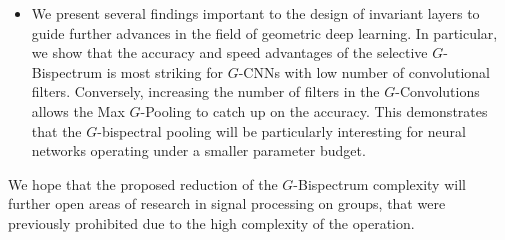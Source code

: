 \documentclass{article}
\theoremstyle{plain}
\theoremstyle{definition}
\theoremstyle{remark}
\begin{document}
\begin{itemize}[leftmargin=*]
    \item We present several findings important to the design of invariant layers to guide further advances in the field of geometric deep learning. In particular, we show that the accuracy and speed advantages of the selective $G$-Bispectrum is most striking for $G$-CNNs with low number of convolutional filters. Conversely, increasing the number of filters in the $G$-Convolutions allows the Max $G$-Pooling to catch up on the accuracy.%
     This demonstrates that the $G$-bispectral pooling will be particularly interesting for neural networks operating under a smaller parameter budget.
\end{itemize}
We hope that the proposed reduction of the $G$-Bispectrum complexity will further open areas of research in signal processing on groups, that were previously prohibited due to the high complexity of the operation.








\end{document}
